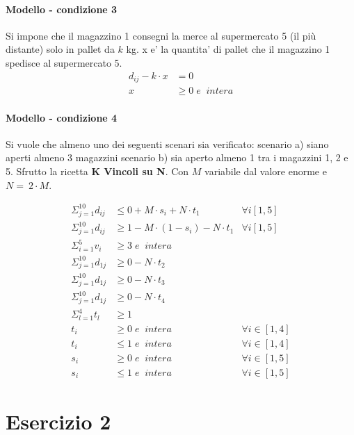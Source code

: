 \documentclass[a4paper,12pt,oneside]{article}
\begin{document}
    \paragraph{Modello - condizione 3}
    Si impone che il magazzino 1 consegni la merce al supermercato 5 (il più distante) solo in pallet da $k$ kg.
    x e' la quantita' di pallet che il magazzino 1 spedisce al supermercato 5.
    \begin{align*}
        d_{ij} - k \cdot x &= 0 \\
        x &\geq 0 \; e \;\; intera
    \end{align*}

    \paragraph{Modello - condizione 4}
    Si vuole che almeno uno dei seguenti scenari sia verificato: scenario a) siano aperti almeno 3 magazzini scenario b) sia aperto almeno 1 tra i magazzini 1, 2 e 5. Sfrutto la ricetta \textbf{K Vincoli su N}.
    Con $M$ variabile dal valore enorme e $N = ~ 2 \cdot M$.

    \begin{align*}
        \Sigma ^ {10} _ {j=1} d_{ij} &\leq 0 + M \cdot s_i + N \cdot t_1 & \forall i [1,5] \\
        \Sigma ^ {10} _ {j=1} d_{ij} &\geq 1 - M \cdot (1 - s_i) - N \cdot t_1 & \forall i [1,5] \\
        \Sigma ^ {5} _ {i=1} v_i &\geq 3 \; e \;\; intera \\
        \Sigma ^ {10} _ {j=1} d_{1j} &\geq 0 - N \cdot t_2 \\
        \Sigma ^ {10} _ {j=1} d_{1j} &\geq 0 - N \cdot t_3 \\
        \Sigma ^ {10} _ {j=1} d_{1j} &\geq 0 - N \cdot t_4 \\
        \Sigma ^ {4} _ {l=1} t_l &\geq 1 \\
        t_i &\geq 0 \; e \;\; intera & \forall i \in [1,4] \\
        t_i &\leq 1 \; e \;\; intera & \forall i \in [1,4] \\
        s_i &\geq 0 \; e \;\; intera & \forall i \in [1,5] \\
        s_i &\leq 1 \; e \;\; intera & \forall i \in [1,5]
    \end{align*}

  \section{Esercizio 2}
\end{document}
